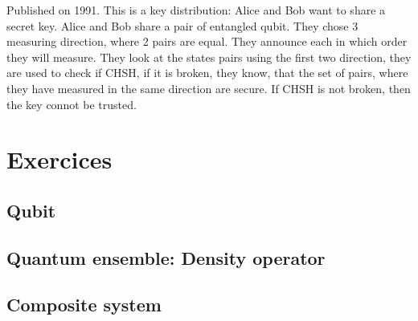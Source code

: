 \documentclass[12pt]{book}
\theoremstyle{definition}
\begin{document}
Published on 1991. This is a key distribution: Alice and Bob want to share a secret key. Alice and Bob share a pair of entangled qubit. They chose 3 measuring direction, where 2 pairs are equal. They announce each in which order they will measure. They look at the states pairs using the first two direction, they are used to check if CHSH, if it is broken, they know, that the set of pairs, where they have measured in the same direction are secure. If CHSH is not broken, then the key connot be trusted.  








\appendix
\chapter{Exercices}
\section{Qubit}

\section{Quantum ensemble: Density operator}

\section{Composite system}
\end{document}
